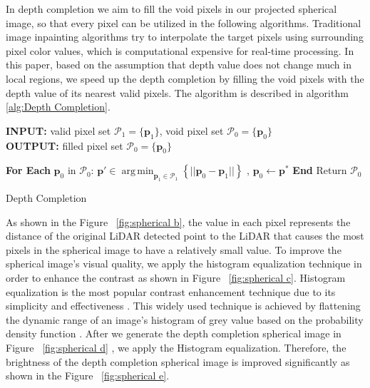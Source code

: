 \documentclass[sigconf]{acmart}
\providecommand{\SetAlgoLined}{\SetLine}
\DeclareMathOperator*{\argmin}{arg\,min}
\begin{document}
In depth completion we aim to fill the void pixels in our projected spherical image, so that every pixel can be utilized in the following algorithms. Traditional image inpainting algorithms try to interpolate the target pixels using surrounding pixel color values, which is computational expensive for real-time processing. In this paper, based on the assumption that depth value does not change much in local regions, we speed up the depth completion by filling the void pixels with the depth value of its nearest valid pixels. The algorithm is described in algorithm \ref{alg:Depth Completion}. 
\begin{algorithm}[t]\footnotesize
	\SetAlgoLined
	\begin{flushleft}

     \textbf{INPUT:} valid pixel set $\mathcal{P}_1 = \{\mathbf{p}_1\}$, void pixel set $\mathcal{P}_0 = \{\mathbf{p}_0\}$\\
	 \textbf{OUTPUT:} filled pixel set $\mathcal{P}_0 = \{\mathbf{p}_0\}$\\
	\end{flushleft}
    \begin{algorithmic}[1]
    \State \textbf{For Each} $\mathbf{p}_0$ in $ \mathcal{P}_0 $:
    \State \quad  $\mathbf{p}' \in \argmin_{\mathbf{p}_1\in \mathcal{P}_1}\left\{||\mathbf{p}_0 - \mathbf{p}_1||\right\}$
,   \State \quad  $\mathbf{p}_0 \leftarrow \mathbf{p}^*$
    \State \textbf{End}
    \State Return $\mathcal{P}_0$
    
    \end{algorithmic}
	\caption{\footnotesize Depth Completion}\label{alg:Depth Completion}
\end{algorithm}



As shown in the Figure ~\ref{fig:spherical b}, the value in each pixel represents the distance of the original LiDAR detected point to the LiDAR that causes the most pixels in the spherical image to have a relatively small value. To improve the spherical image’s visual quality, we apply the histogram equalization technique in order to enhance the contrast as shown in Figure ~\ref{fig:spherical c}. Histogram equalization is the most popular contrast enhancement technique due to its simplicity and effectiveness \cite{2008digital}. This widely used technique is achieved by flattening the dynamic range of an image’s histogram of grey value based on the probability density function \cite{contrastenhancement}. After we generate the depth completion spherical image in Figure ~\ref{fig:spherical d} , we apply the Histogram equalization. Therefore, the brightness of the depth completion spherical image is improved significantly as shown in the Figure ~\ref{fig:spherical e}.
\end{document}
